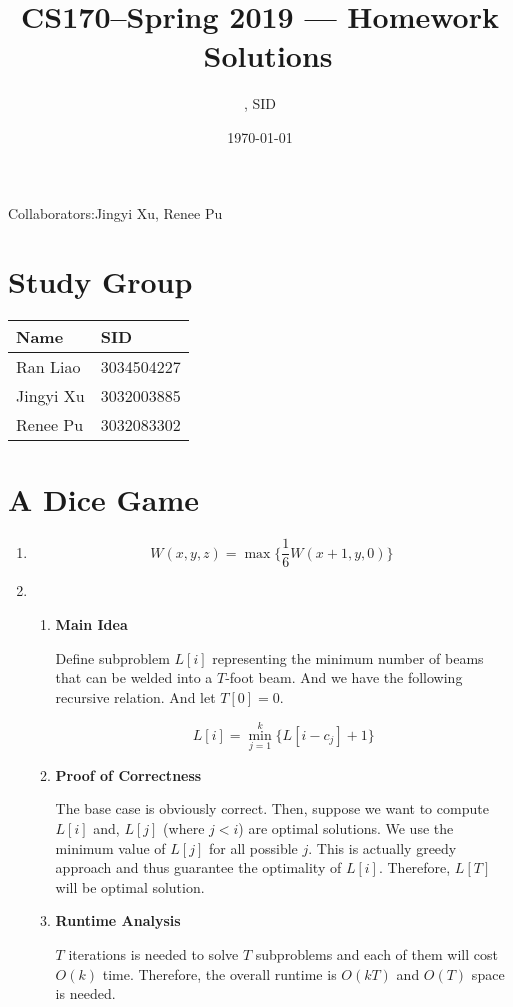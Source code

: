 \documentclass[11pt]{article}
\title{CS170--Spring 2019 --- Homework \Homework\ Solutions}
\author{\Name, SID \SID}
\date{\today}
\newenvironment{qparts}{\begin{enumerate}[{(}a{)}]}{\end{enumerate}}
\begin{document}
\maketitle
Collaborators:Jingyi Xu, Renee Pu

\section{Study Group}
	\begin{tabular}{ll}
		Name		&   SID         		\\\hline
		Ran Liao		&   3034504227  	\\  
		Jingyi Xu		&   3032003885  	\\
		Renee Pu		&   3032083302  	\\
	\end{tabular}

	



\newpage
\section{A Dice Game}
\begin{qparts}
	
	\item 
	
	\[
		W(x, y, z) = \max \{\frac{1}{6} W(x+1, y, 0)\}		
	\]
	
	\item 
	
	\renewcommand{\theenumii}{\roman{enumii}}
	\begin{enumerate}
		\item \textbf{Main Idea}
		
		Define subproblem $L[i]$ representing the minimum number of beams that can be welded into a $T$-foot beam. And we have the following recursive relation. And let $T[0] = 0$.
		
		\[
			L[i] = \min_{j=1}^{k}\{L[i - c_j] + 1\}
		\]
		
		\item \textbf{Proof of Correctness}
		
		The base case is obviously correct. Then, suppose we want to compute $L[i]$ and, $L[j]$ (where $j<i$) are optimal solutions. We use the minimum value of $L[j]$ for all possible $j$. This is actually greedy approach and thus guarantee the  optimality of $L[i]$. Therefore, $L[T]$ will be optimal solution.
		
		\item \textbf{Runtime Analysis}
		
		$T$ iterations is needed to solve $T$ subproblems and each of them will cost $O(k)$ time. Therefore, the overall runtime is $O(kT)$ and $O(T)$ space is needed.
	
	\end{enumerate}
		
\end{qparts}
\end{document}
